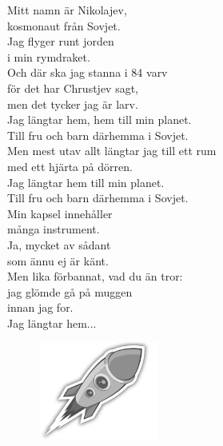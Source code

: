 \documentclass[a6paper, 10pt, twoside]{article}
\begin{document}
\begin{center}
\end{center}
\begin{lyrics}
\small Mitt namn är Nikolajev,\\ 
kosmonaut från Sovjet.\\ 
Jag flyger runt jorden\\ 
i min rymdraket.\\ 
Och där ska jag stanna i 84 varv\\ 
för det har Chrustjev sagt,\\ 
men det tycker jag är larv.
\vspace{5pt}\\ 
Jag längtar hem, hem till min planet.\\ 
Till fru och barn därhemma i Sovjet.\\ 
Men mest utav allt längtar jag till ett rum\\ 
med ett hjärta på dörren.\\ 
Jag längtar hem till min planet.\\ 
Till fru och barn därhemma i Sovjet.
\vspace{5pt}\\ 
Min kapsel innehåller\\ 
många instrument.\\ 
Ja, mycket av sådant\\ 
som ännu ej är känt.\\ 
Men lika förbannat, vad du än tror:\\ 
jag glömde gå på muggen\\ 
innan jag for.
\vspace{5pt}\\ 
Jag längtar hem...\\
\end{lyrics}

\begin{figure}[!h]
\hfill
\includegraphics[width=0.35\textwidth]{rymdraket.png}
\end{figure}
\end{document}
